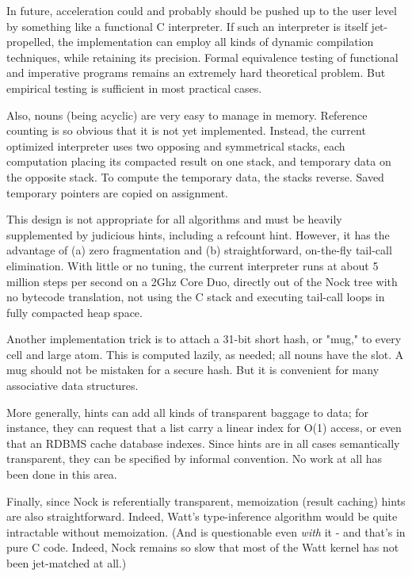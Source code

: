 \documentclass[10pt, nocopyrightspace]{sigplanconf}
\begin{document}
In future, acceleration could and probably should be pushed up to
the user level by something like a functional C interpreter.  If
such an interpreter is itself jet-propelled, the implementation
can employ all kinds of dynamic compilation techniques, while
retaining its precision.  Formal equivalence testing of
functional and imperative programs remains an extremely hard
theoretical problem.  But empirical testing is sufficient in most
practical cases.

Also, nouns (being acyclic) are very easy to manage in memory.
Reference counting is so obvious that it is not yet implemented.
Instead, the current optimized interpreter uses two opposing
and symmetrical stacks, each computation placing its compacted
result on one stack, and temporary data on the opposite stack.
To compute the temporary data, the stacks reverse.  Saved
temporary pointers are copied on assignment.

This design is not appropriate for all algorithms and must be
heavily supplemented by judicious hints, including a refcount
hint.  However, it has the advantage of (a) zero fragmentation
and (b) straightforward, on-the-fly tail-call elimination.  With
little or no tuning, the current interpreter runs at about 5
million steps per second on a 2Ghz Core Duo, directly out of the
Nock tree with no bytecode translation, not using the C stack and
executing tail-call loops in fully compacted heap space.

Another implementation trick is to attach a 31-bit short hash, or
"mug," to every cell and large atom.  This is computed lazily, as
needed; all nouns have the slot.  A mug should not be mistaken
for a secure hash.  But it is convenient for many associative
data structures.

More generally, hints can add all kinds of transparent baggage to
data; for instance, they can request that a list carry a linear
index for O(1) access, or even that an RDBMS cache database
indexes.  Since hints are in all cases semantically transparent,
they can be specified by informal convention.  No work at all has
been done in this area.

Finally, since Nock is referentially transparent, memoization
(result caching) hints are also straightforward.  Indeed, Watt's
type-inference algorithm would be quite intractable without
memoization.  (And is questionable even \emph{with} it - and
that's in pure C code.  Indeed, Nock remains so slow that most of
the Watt kernel has not been jet-matched at all.)
\end{document}
